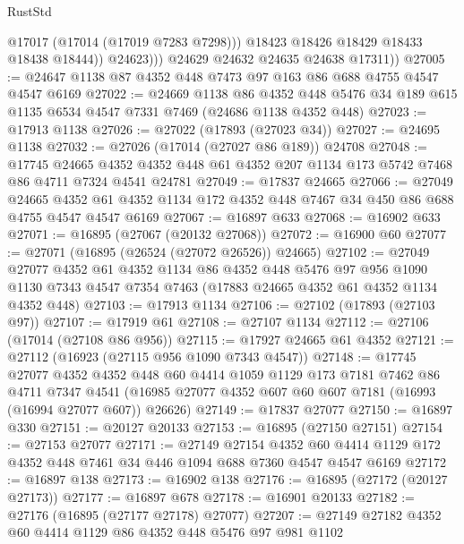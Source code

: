 \begin{lexlean}{RustStd}
\begin{coremodule}
                    @17017
                    (@17014 (@17019 @7283 @7298)))
                  @18423
                  @18426
                  @18429
                  @18433
                  @18438
                  @18444))
              @24623)))
        @24629
        @24632
        @24635
        @24638
        @17311))
@27005 := @24647 @1138 @87 @4352 @448 @7473 @97 @163 @86 @688 @4755 @4547 @4547 @6169
@27022 := @24669
    @1138
    @86
    @4352
    @448
    @5476
    @34
    @189
    @615
    @1135
    @6534
    @4547
    @7331
    @7469
    (@24686 @1138 @4352 @448)
@27023 := @17913 @1138
@27026 := @27022 (@17893 (@27023 @34))
@27027 := @24695 @1138
@27032 := @27026 (@17014 (@27027 @86 @189)) @24708
@27048 := @17745
    @24665
    @4352
    @4352
    @448
    @61
    @4352
    @207
    @1134
    @173
    @5742
    @7468
    @86
    @4711
    @7324
    @4541
    @24781
@27049 := @17837 @24665
@27066 := @27049
    @24665
    @4352
    @61
    @4352
    @1134
    @172
    @4352
    @448
    @7467
    @34
    @450
    @86
    @688
    @4755
    @4547
    @4547
    @6169
@27067 := @16897 @633
@27068 := @16902 @633
@27071 := @16895 (@27067 (@20132 @27068))
@27072 := @16900 @60
@27077 := @27071 (@16895 (@26524 (@27072 @26526)) @24665)
@27102 := @27049
    @27077
    @4352
    @61
    @4352
    @1134
    @86
    @4352
    @448
    @5476
    @97
    @956
    @1090
    @1130
    @7343
    @4547
    @7354
    @7463
    (@17883 @24665 @4352 @61 @4352 @1134 @4352 @448)
@27103 := @17913 @1134
@27106 := @27102 (@17893 (@27103 @97))
@27107 := @17919 @61
@27108 := @27107 @1134
@27112 := @27106 (@17014 (@27108 @86 @956))
@27115 := @17927 @24665 @61 @4352
@27121 := @27112 (@16923 (@27115 @956 @1090 @7343 @4547))
@27148 := @17745
    @27077
    @4352
    @4352
    @448
    @60
    @4414
    @1059
    @1129
    @173
    @7181
    @7462
    @86
    @4711
    @7347
    @4541
    (@16985 @27077 @4352 @607 @60 @607 @7181 (@16993 (@16994 @27077 @607)) @26626)
@27149 := @17837 @27077
@27150 := @16897 @330
@27151 := @20127 @20133
@27153 := @16895 (@27150 @27151)
@27154 := @27153 @27077
@27171 := @27149
    @27154
    @4352
    @60
    @4414
    @1129
    @172
    @4352
    @448
    @7461
    @34
    @446
    @1094
    @688
    @7360
    @4547
    @4547
    @6169
@27172 := @16897 @138
@27173 := @16902 @138
@27176 := @16895 (@27172 (@20127 @27173))
@27177 := @16897 @678
@27178 := @16901 @20133
@27182 := @27176 (@16895 (@27177 @27178) @27077)
@27207 := @27149
    @27182
    @4352
    @60
    @4414
    @1129
    @86
    @4352
    @448
    @5476
    @97
    @981
    @1102

\end{coremodule}
\end{lexlean}
